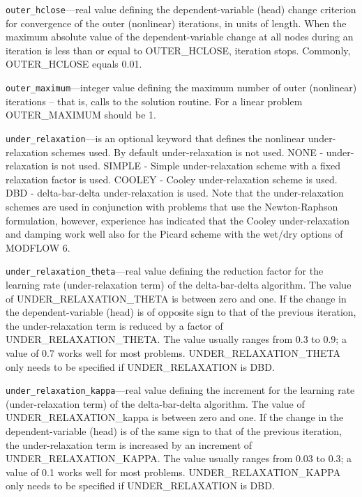 \begin{description}
\item \texttt{outer\_hclose}---real value defining the dependent-variable (head) change criterion for convergence of the outer (nonlinear) iterations, in units of length. When the maximum absolute value of the dependent-variable change at all nodes during an iteration is less than or equal to OUTER\_HCLOSE, iteration stops. Commonly, OUTER\_HCLOSE equals 0.01.

\item \texttt{outer\_maximum}---integer value defining the maximum number of outer (nonlinear) iterations -- that is, calls to the solution routine. For a linear problem OUTER\_MAXIMUM should be 1.

\item \texttt{under\_relaxation}---is an optional keyword that defines the nonlinear under-relaxation schemes used. By default under-relaxation is not used.  NONE - under-relaxation is not used. SIMPLE - Simple under-relaxation scheme with a fixed relaxation factor is used.  COOLEY - Cooley under-relaxation scheme is used.  DBD - delta-bar-delta under-relaxation is used.  Note that the under-relaxation schemes are used in conjunction with problems that use the Newton-Raphson formulation, however, experience has indicated that the Cooley under-relaxation and damping work well also for the Picard scheme with the wet/dry options of MODFLOW 6.

\item \texttt{under\_relaxation\_theta}---real value defining the reduction factor for the learning rate (under-relaxation term) of the delta-bar-delta algorithm. The value of UNDER\_RELAXATION\_THETA is between zero and one. If the change in the dependent-variable (head) is of opposite sign to that of the previous iteration, the under-relaxation term is reduced by a factor of UNDER\_RELAXATION\_THETA. The value usually ranges from 0.3 to 0.9; a value of 0.7 works well for most problems. UNDER\_RELAXATION\_THETA only needs to be specified if UNDER\_RELAXATION is DBD.

\item \texttt{under\_relaxation\_kappa}---real value defining the increment for the learning rate (under-relaxation term) of the delta-bar-delta algorithm. The value of UNDER\_RELAXATION\_kappa is between zero and one. If the change in the dependent-variable (head) is of the same sign to that of the previous iteration, the under-relaxation term is increased by an increment of UNDER\_RELAXATION\_KAPPA. The value usually ranges from 0.03 to 0.3; a value of 0.1 works well for most problems. UNDER\_RELAXATION\_KAPPA only needs to be specified if UNDER\_RELAXATION is DBD.


\end{description}
